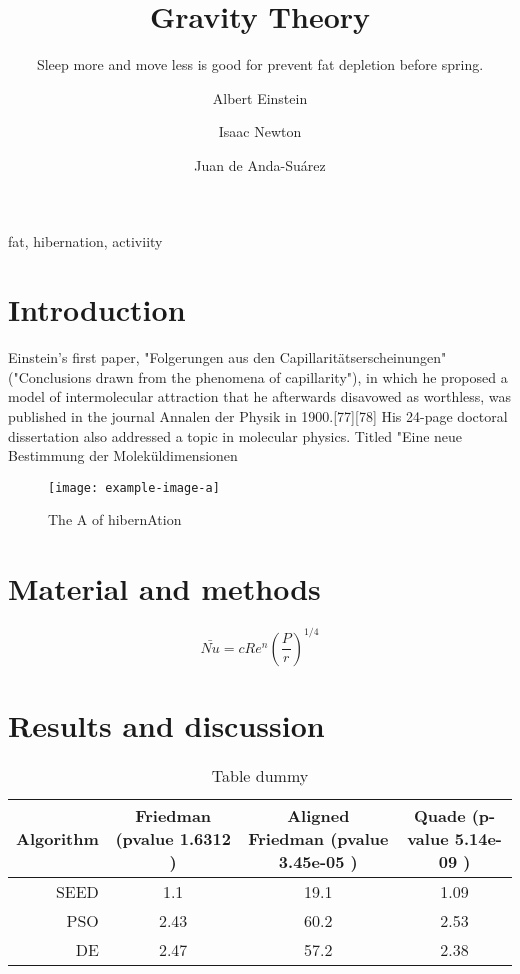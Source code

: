 \documentclass{SFEE}
\begin{document}

\title{Gravity Theory}
\subtitle{Sleep more and move less is good for prevent fat depletion before   spring.}
\author[1,*]{Albert Einstein }
\author[2]{Isaac Newton}
\author[3]{Juan de Anda-Suárez }
\maketitle
\begin{abstract}
    \lipsum[5]
\end{abstract}
\begin{keywords}
    fat, hibernation, activiity
\end{keywords}

\section{Introduction}

Einstein's first paper, "Folgerungen aus den Capillaritätserscheinungen" ("Conclusions drawn from the phenomena of capillarity"), in which he proposed a model of intermolecular attraction that he afterwards disavowed as worthless, was published in the journal Annalen der Physik in 1900.[77][78] His 24-page doctoral dissertation also addressed a topic in molecular physics. Titled "Eine neue Bestimmung der Moleküldimensionen \cite{1908JRE.....4..411E}

\begin{figure}[b!]
\texttt{[image: example-image-a]}
\caption{The A of hibernAtion}
\end{figure}
\lipsum[10-13]
\section{Material and methods}
\lipsum[14-17]
\begin{equation}
 \bar{Nu}=cRe^{n}\left ( \frac{P}{r} \right )^{1/4}
\end{equation}
\section{Results and discussion}
\lipsum[18-25]
\begin{table*}[htb]
     \caption{Table dummy}
    \footnotesize
    \center
    \begin{tabular}{rccc}
    \hline \hline
    Algorithm & Friedman (pvalue 1.6312 ) & Aligned Friedman  (pvalue 3.45e-05 ) & Quade (p-value 5.14e-09 )  \\
    \hline
     SEED & 1.1  & 19.1 & 1.09   \\
     \hline
     PSO  & 2.43 & 60.2 & 2.53   \\
     \hline
     DE   & 2.47 & 57.2 & 2.38  \\
    \hline

    \hline \hline
    \end{tabular}
  
    \end{table*}
\end{document}
